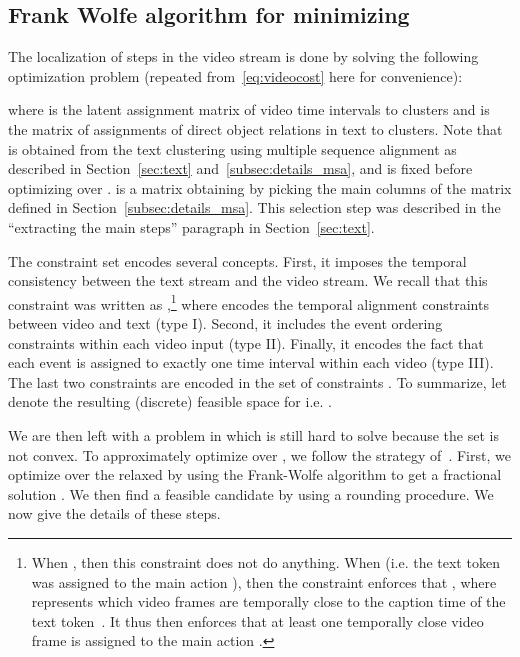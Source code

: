 \documentclass[10pt,twocolumn,letterpaper]{article}
\begin{document}
\subsection{Frank Wolfe algorithm for minimizing }
\label{subsec:fw_dp}

The localization of steps in the video stream is done by solving the following optimization problem
(repeated from~\eqref{eq:videocost} here for convenience):

where  is the latent assignment matrix of video time intervals to  clusters and  is the matrix of assignments of direct object relations in text to  clusters.
Note that  is obtained from the text clustering using multiple sequence alignment as described in Section~\ref{sec:text} and~\ref{subsec:details_msa}, and is fixed before optimizing over .
 is a  matrix obtaining by picking the  main columns of the  matrix
defined in Section~\ref{subsec:details_msa}. This selection step
was described in the ``extracting the main steps'' paragraph in Section~\ref{sec:text}.

The constraint set encodes several concepts.
First, it imposes the temporal consistency between the text stream and the video stream. 
We recall that this constraint was written as ,\footnote{
When , then this constraint does not do anything. When  (i.e. the
text token  was assigned to the main action ), then the constraint enforces
that , where  represents
which video frames are temporally close to the caption time of the text token~.
It thus then enforces that at least one temporally close video frame is assigned
to the main action .
} 
where  encodes the temporal alignment constraints between video and text (type I).
Second, it includes the event ordering constraints within each video input (type II).
Finally, it encodes the fact that each event is assigned to exactly one time interval within each video (type III).
The last two constraints are encoded in the set of constraints .
To summarize, let  denote the resulting (discrete) feasible space for  i.e. .






We are then left with a problem in  which is still hard to solve because the set  is not convex. 
To approximately optimize  over , we follow the strategy of~\cite{Bojanowski14weakly,Bojanowski15weakly}.  First, we optimize  over the relaxed  by using the Frank-Wolfe algorithm to get a fractional solution . We then find a feasible candidate  by using a rounding procedure. We now give the details of these steps.  
\end{document}
